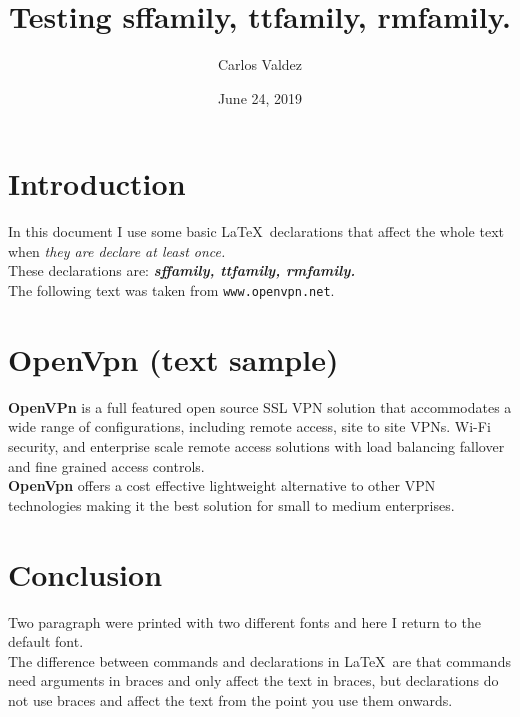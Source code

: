 \documentclass[a4paper,11pt]{article}
\begin{document}
\title{Testing sffamily, ttfamily, rmfamily.}
\author{Carlos Valdez}
\date{June 24, 2019}
\maketitle

\section{Introduction}

In this document I use some basic \LaTeX\ declarations that affect
the whole text when \emph{they are declare at least once.}\\

These declarations are: \emph{\textbf{sffamily, ttfamily, rmfamily.}}\\

The following text was taken from \texttt{www.openvpn.net}.

\section{OpenVpn (text sample)}

\sffamily \textbf{OpenVPn} is a full featured open source SSL VPN solution that
accommodates a wide range of configurations, including remote access,
site to site VPNs. Wi-Fi security, and enterprise scale remote access
solutions with load balancing fallover and fine grained access controls.
\\

\ttfamily \textbf{OpenVpn} offers a cost effective lightweight alternative
to other VPN technologies making it the best solution for small to medium
enterprises.

\section{Conclusion}

\rmfamily Two paragraph were printed with two different fonts and here
I return to the default font.\\

The difference between commands and declarations in \LaTeX\ are that
commands need arguments in braces and only affect the text in braces,
but declarations do not use braces and affect the text from the
point you use them onwards.
\end{document}
